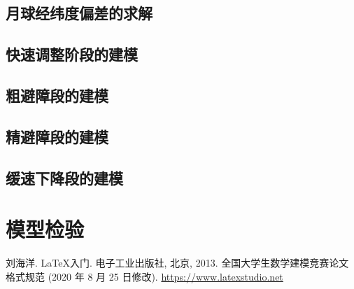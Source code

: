 \documentclass[withoutpreface,bwprint]{cumcmthesis} %
\begin{document}
    \subsection{月球经纬度偏差的求解}
    \subsection{快速调整阶段的建模}
    \subsection{粗避障段的建模}
    \subsection{精避障段的建模}
    \subsection{缓速下降段的建模}
    \subsection{}
    
    \section{模型检验}

    \begin{thebibliography}{9}%
        刘海洋.
        \newblock \LaTeX {}入门\allowbreak[J].
        \newblock 电子工业出版社, 北京, 2013.
        全国大学生数学建模竞赛论文格式规范 (2020 年 8 月 25 日修改).
         \url{https://www.latexstudio.net}
    \end{thebibliography}

    \newpage
    \begin{appendices}
    \end{appendices}
\end{document}
